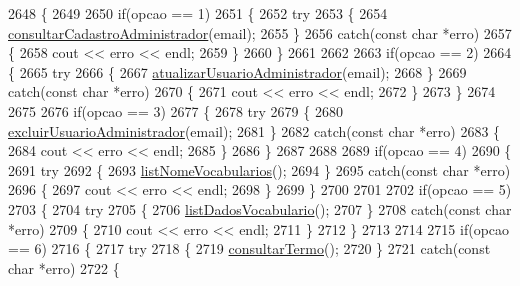 \begin{DoxyCode}
2648 \{
2649 
2650   \textcolor{keywordflow}{if}(opcao == 1)
2651   \{
2652     \textcolor{keywordflow}{try}
2653     \{
2654       \mbox{\hyperlink{class_servico_usuarios_administrador_ae1474bec1c712ba5640c83f4fe666fc4}{consultarCadastroAdministrador}}(email);
2655     \}
2656     \textcolor{keywordflow}{catch}(\textcolor{keyword}{const} \textcolor{keywordtype}{char} *erro)
2657     \{
2658       cout << erro << endl;
2659     \}
2660   \}
2661 
2662 
2663   \textcolor{keywordflow}{if}(opcao == 2)
2664   \{
2665     \textcolor{keywordflow}{try}
2666     \{
2667       \mbox{\hyperlink{class_servico_usuarios_administrador_a1111b56d40dff5aa7186c4f3dfe2e598}{atualizarUsuarioAdministrador}}(email);
2668     \}
2669     \textcolor{keywordflow}{catch}(\textcolor{keyword}{const} \textcolor{keywordtype}{char} *erro)
2670     \{
2671       cout << erro << endl;
2672     \}
2673   \}
2674 
2675 
2676   \textcolor{keywordflow}{if}(opcao == 3)
2677   \{
2678     \textcolor{keywordflow}{try}
2679     \{
2680       \mbox{\hyperlink{class_servico_usuarios_administrador_a1295e808f5e6322a8e329ff711b2b428}{excluirUsuarioAdministrador}}(email);
2681     \}
2682     \textcolor{keywordflow}{catch}(\textcolor{keyword}{const} \textcolor{keywordtype}{char} *erro)
2683     \{
2684       cout << erro << endl;
2685     \}
2686   \}
2687 
2688 
2689   \textcolor{keywordflow}{if}(opcao == 4)
2690   \{
2691     \textcolor{keywordflow}{try}
2692     \{
2693       \mbox{\hyperlink{class_servico_usuarios_administrador_a72b7761474e413704531b3234744d0e0}{listNomeVocabularios}}();
2694     \}
2695     \textcolor{keywordflow}{catch}(\textcolor{keyword}{const} \textcolor{keywordtype}{char} *erro)
2696     \{
2697       cout << erro << endl;
2698     \}
2699   \}
2700 
2701 
2702   \textcolor{keywordflow}{if}(opcao == 5)
2703   \{
2704     \textcolor{keywordflow}{try}
2705     \{
2706       \mbox{\hyperlink{class_servico_usuarios_administrador_adddc69a01b3ffb101f3a0b5825dde223}{listDadosVocabulario}}();
2707     \}
2708     \textcolor{keywordflow}{catch}(\textcolor{keyword}{const} \textcolor{keywordtype}{char} *erro)
2709     \{
2710       cout << erro << endl;
2711     \}
2712   \}
2713 
2714 
2715   \textcolor{keywordflow}{if}(opcao == 6)
2716   \{
2717     \textcolor{keywordflow}{try}
2718     \{
2719       \mbox{\hyperlink{class_servico_usuarios_administrador_aec8b05b7c4a2fb318b6be8f6704d68eb}{consultarTermo}}();
2720     \}
2721     \textcolor{keywordflow}{catch}(\textcolor{keyword}{const} \textcolor{keywordtype}{char} *erro)
2722     \{

\end{DoxyCode}
